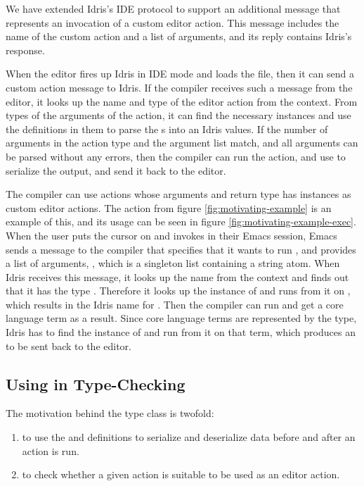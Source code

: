 We have extended Idris's IDE protocol to support an additional message that
represents an invocation of a custom editor action.
This message includes the name of the custom action and a list of arguments,
and its reply contains Idris's response.

When the editor fires up Idris in IDE mode and loads the file, then it can send
a custom action message to Idris. If the compiler receives such a message from
the editor, it looks up the name and type of the editor action from the
context. From types of the arguments of the \Elab{} action, it can find the
necessary \Editorable{} instances and use the  definitions in them
to parse the \sexp{}s into an Idris values. If the number of arguments in the
action type and the argument list match, and all arguments can be parsed
without any errors, then the compiler can run the \Elab{} action, and use
 to serialize the output, and send it back to the editor.

The compiler can use \Elab{} actions whose arguments and return type has
\Editorable{} instances as custom editor actions. The  action from
figure \ref{fig:motivating-example} is an example of this, and its usage can be
seen in figure \ref{fig:motivating-example-exec}.
When the user puts the cursor on  and invokes
 in their Emacs session, Emacs sends a message to the compiler
that specifies that it wants to run , and provides a list of
arguments, , which is a singleton list
containing a string atom. When Idris receives this message, it looks up the
name  from the context and finds out that it has the type
. Therefore it looks up the \Editorable{}
instance of  and runs  from it on , which
results in the Idris name for . Then the compiler can run
 and get a core language term \dt{()} as a result. Since core
language terms are represented by the \TT{} type, Idris has to find the
\Editorable{} instance of \TT{} and run  from it on that term,
which produces an \sexp{} to be sent back to the editor.

\subsection{Using \Editorable{} in Type-Checking}
\label{ssec:typechecking}

The motivation behind the  type class is twofold:
\begin{enumerate}
\item to use the  and  definitions to serialize
  and deserialize data before and after an \Elab{} action is run.
\item to check whether a given \Elab{} action is suitable to be used as an
  editor action.
\end{enumerate}

